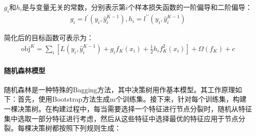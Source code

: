 \documentclass[bwprint]{gmcmthesis}
\begin{document}
$g_i$和$h_i$是与变量无关的常数，分别表示第$i$个样本损失函数的一阶偏导和二阶偏导：
\begin{equation}
\begin{aligned}
g_i=l^{\prime}\left(y_i, \hat{y}_i^{K-1}\right), h_i=l^{\prime \prime}\left(y_i, \hat{y}_i^{K-1}\right)
\end{aligned}
\label{equ:7}
\end{equation}

简化后的目标函数可表示为：
\begin{equation}
\begin{aligned}
\mathrm{obj}^K=\sum_i\left[L\left(y_i, \hat{y}_i^{K-1}\right)+g_i f_K\left(x_i\right)+\frac{1}{2} h_i f_K^2\left(x_i\right)\right]+\Omega\left(f_K\right)+c
\end{aligned}
\label{equ:8}
\end{equation}

\paragraph{随机森林模型} 
\paragraph{\hspace{3em}}随机森林是一种特殊的Bagging方法，其中决策树用作基本模型\cite{方匡南2011随机森林方法研究综述}。其工作原理如下：首先，使用Bootstrap方法生成m个训练集。接下来，针对每个训练集，构建一棵决策树。在构建过程中，每当需要选择一个特征进行节点分裂时，随机从特征集中选取一部分特征进行考虑，然后从这些特征中选择最优的特征应用于节点分裂。每棵决策树都按照下列规则生成：
\end{document}
